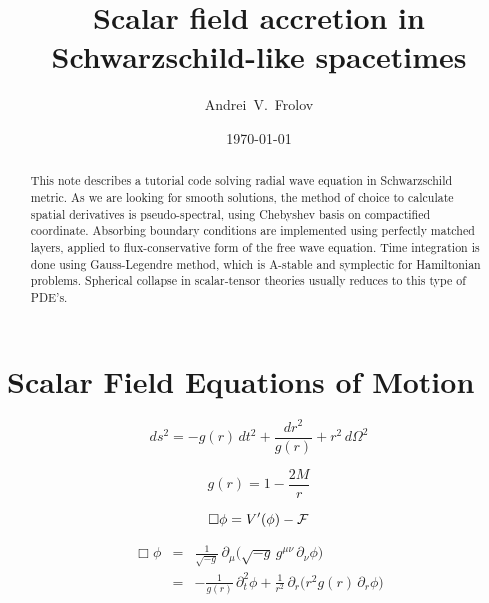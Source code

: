 \documentclass[aps,prd,reprint,twocolumn,groupedaddress]{revtex4-1}
\begin{document}

\title{Scalar field accretion in Schwarzschild-like spacetimes}

\author{Andrei~V.~Frolov}

\date{\today}

\begin{abstract}
  This note describes a tutorial code solving radial wave equation in Schwarzschild metric.  As we are looking for smooth solutions, the method of choice to calculate  spatial derivatives is pseudo-spectral, using Chebyshev basis on compactified  coordinate. Absorbing boundary conditions are implemented using perfectly matched layers,  applied to flux-conservative form of the free wave equation. Time integration is done using Gauss-Legendre method,   which is A-stable and symplectic for Hamiltonian problems. Spherical collapse in scalar-tensor theories usually reduces to this type of PDE's.
\end{abstract}


\maketitle

\section{Scalar Field Equations of Motion}

\begin{equation}
  ds^2 = -g(r)\, dt^2 + \frac{dr^2}{g(r)} + r^2\, d\Omega^2
\end{equation}

\begin{equation}
  g(r) = 1 - \frac{2M}{r}
\end{equation}

\begin{equation}
  \Box\phi = V'(\phi) - {\cal F}
\end{equation}

\begin{eqnarray}
  \Box\phi &=& 
  \frac{1}{\sqrt{-g}}\, \partial_\mu \Big( \sqrt{-g}\, g^{\mu\nu}\, \partial_\nu \phi \Big)\nonumber\\ &=&
  - \frac{1}{g(r)}\, \partial_t^2 \phi + \frac{1}{r^2}\, \partial_r \Big( r^2 g(r)\, \partial_r \phi \Big)
\end{eqnarray}
\end{document}
